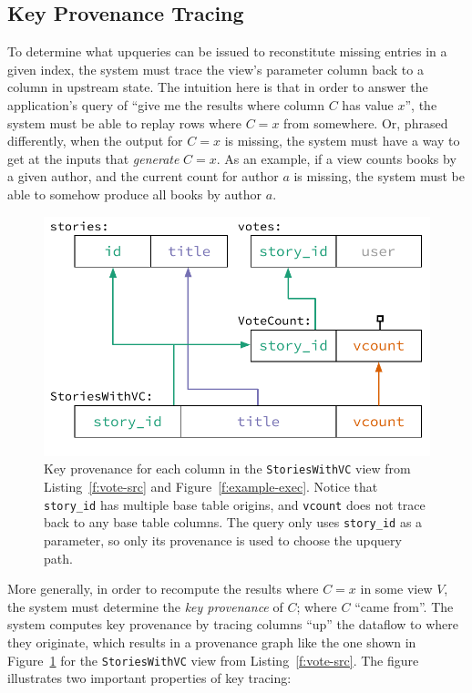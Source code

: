 \subsection{Key Provenance Tracing}

To determine what upqueries can be issued to reconstitute missing entries in a
given index, the system must trace the view's parameter column back to a column
in upstream state. The intuition here is that in order to answer the
application's query of ``give me the results where column $C$ has value $x$'',
the system must be able to replay rows where $C = x$ from somewhere. Or, phrased
differently, when the output for $C = x$ is missing, the system must have a way
to get at the inputs that \emph{generate} $C = x$. As an example, if a view
counts books by a given author, and the current count for author $a$ is missing,
the system must be able to somehow produce all books by author $a$.

\begin{figure}[t]
  \centering
  \includegraphics{diagrams/Key Provenance.pdf}
  \caption{Key provenance for each column in the \texttt{StoriesWithVC} view
  from Listing~\ref{f:vote-src} and Figure~\ref{f:example-exec}. Notice that
  \texttt{story\_id} has multiple base table origins, and \texttt{vcount} does
  not trace back to any base table columns. The query only uses
  \texttt{story\_id} as a parameter, so only its provenance is used to choose
  the upquery path.}
  \label{f:key-prov}
\end{figure}

More generally, in order to recompute the results where $C = x$ in some view
$V$, the system must determine the \textit{key provenance} of $C$; where $C$
``came from''. The system computes key provenance by tracing columns ``up'' the
dataflow to where they originate, which results in a provenance graph like the
one shown in Figure~\ref{f:key-prov} for the \texttt{StoriesWithVC} view from
Listing~\ref{f:vote-src}. The figure illustrates two important properties of
key tracing:

